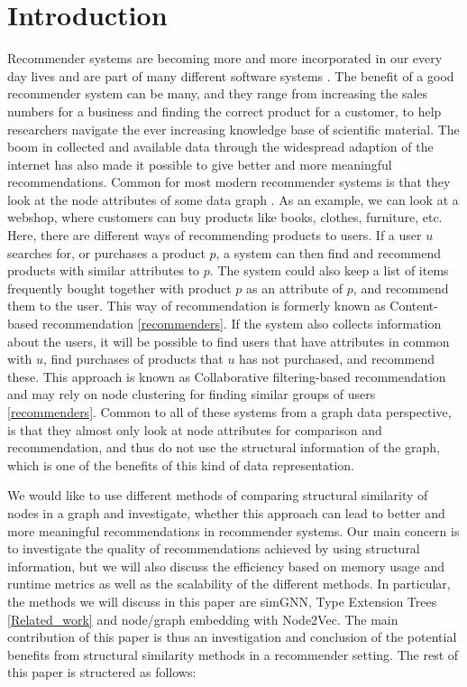 \section{Introduction}
  Recommender systems are becoming more and more incorporated in our every day lives and are part of many different software systems \cite{recommender_e-comerce}. The benefit of a good recommender system can be many, and they range from increasing the sales numbers for a business and finding the correct product for a customer, to help researchers navigate the ever increasing knowledge base of scientific material. The boom in collected and available data through the widespread adaption of the internet has also made it possible to give better and more meaningful recommendations.
  Common for most modern recommender systems is that they look at the node attributes of some data graph \cite{Ricci2015}. As an example, we can look at a webshop, where customers can buy products like books, clothes, furniture, etc. Here, there are different ways of recommending products to users. If a user $u$ searches for, or purchases a product $p$, a system can then find and recommend products with similar attributes to $p$. The system could also keep a list of items frequently bought together with product $p$ as an attribute of $p$, and recommend them to the user. This way of recommendation is formerly known as Content-based recommendation \ref{recommenders}. If the system also collects information about the users, it will be possible to find users that have attributes in common with $u$, find purchases of products that $u$ has not purchased, and recommend these. This approach is known as Collaborative filtering-based recommendation and may rely on node clustering for finding similar groups of users \ref{recommenders}. Common to all of these systems from a graph data perspective, is that they almost only look at node attributes for comparison and recommendation, and thus do not use the structural information of the graph, which is one of the benefits of this kind of data representation.

  We would like to use different methods of comparing structural similarity of nodes in a graph and investigate, whether this approach can lead to better and more meaningful recommendations in recommender systems. Our main concern is to investigate the quality of recommendations achieved by using structural information, but we will also discuss the efficiency based on memory usage and runtime metrics as well as the scalability of the different methods. In particular, the methods we will discuss in this paper are simGNN, Type Extension Trees \ref{Related_work} and node/graph embedding with Node2Vec.
  The main contribution of this paper is thus an investigation and conclusion of the potential benefits from structural similarity methods in a recommender setting. The rest of this paper is structered as follows:
